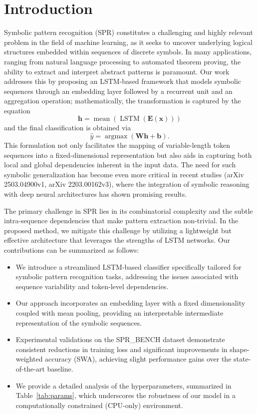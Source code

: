 \documentclass{article}
\begin{document}
\section{Introduction}
Symbolic pattern recognition (SPR) constitutes a challenging and highly relevant problem in the field of machine learning, as it seeks to uncover underlying logical structures embedded within sequences of discrete symbols. In many applications, ranging from natural language processing to automated theorem proving, the ability to extract and interpret abstract patterns is paramount. Our work addresses this by proposing an LSTM-based framework that models symbolic sequences through an embedding layer followed by a recurrent unit and an aggregation operation; mathematically, the transformation is captured by the equation 
\[
\mathbf{h} = \operatorname{mean}\left(\operatorname{LSTM}\left(\mathbf{E}(\mathbf{x})\right)\right)
\]
and the final classification is obtained via 
\[
\hat{y} = \operatorname{argmax}\left(\mathbf{W}\mathbf{h} + \mathbf{b}\right).
\]
This formulation not only facilitates the mapping of variable-length token sequences into a fixed-dimensional representation but also aids in capturing both local and global dependencies inherent in the input data. The need for such symbolic generalization has become even more critical in recent studies (arXiv 2503.04900v1, arXiv 2203.00162v3), where the integration of symbolic reasoning with deep neural architectures has shown promising results.

The primary challenge in SPR lies in its combinatorial complexity and the subtle intra-sequence dependencies that make pattern extraction non-trivial. In the proposed method, we mitigate this challenge by utilizing a lightweight but effective architecture that leverages the strengths of LSTM networks. Our contributions can be summarized as follows:
\begin{itemize}
    \item We introduce a streamlined LSTM-based classifier specifically tailored for symbolic pattern recognition tasks, addressing the issues associated with sequence variability and token-level dependencies.
    \item Our approach incorporates an embedding layer with a fixed dimensionality coupled with mean pooling, providing an interpretable intermediate representation of the symbolic sequences.
    \item Experimental validations on the SPR\_BENCH dataset demonstrate consistent reductions in training loss and significant improvements in shape-weighted accuracy (SWA), achieving slight performance gains over the state-of-the-art baseline.
    \item We provide a detailed analysis of the hyperparameters, summarized in Table~\ref{tab:params}, which underscores the robustness of our model in a computationally constrained (CPU-only) environment.
\end{itemize}
\end{document}
